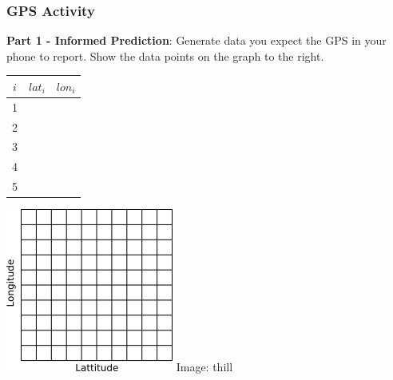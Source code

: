 \documentclass[fleqn]{beamer} %
\newcommand{\sectionIsubsectionIVtitle}{GPS Activity}
\begin{document}
			\begin{frame}
				\frametitle{\sectionIsubsectionIVtitle}
				\scriptsize
				{\bf Part 1 - Informed Prediction}: Generate data you expect the GPS in your phone to report. Show the data points on the graph to the right.  \\
				
				\begin{multicols}{2}
					\setlength{\tabcolsep}{20pt}
					\renewcommand{\arraystretch}{1.4}
					\begin{tabular}{|c|c|c|} \hline
					$i$ & $lat_i$ & $lon_i$ \\\hline
					  1  & &              \\ \hline
					  2  & &              \\ \hline
					  3  & &              \\ \hline
					  4  & &              \\ \hline
					  5  & &              \\ \hline

					\end{tabular}

					\includegraphics[scale=1]{images/lat_lon_grid.png}
					{\tiny Image: thill}
				\end{multicols}	

			\end{frame}
\end{document}
